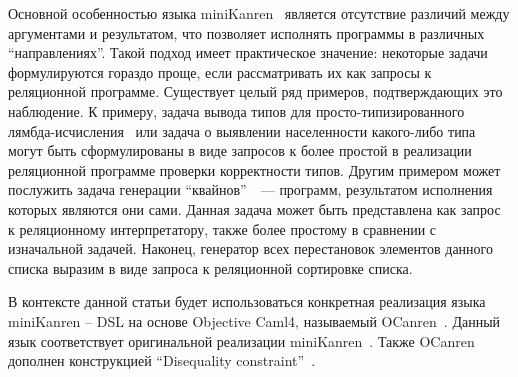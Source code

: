 Основной особенностью языка miniKanren~\cite{lozov-spbu:TheReasonedSchemer,lozov-spbu:miniKanren} является отсутствие различий между аргументами и результатом, что позволяет исполнять программы в различных ``направлениях''. Такой подход имеет практическое значение: некоторые задачи формулируются гораздо проще, если рассматривать их как запросы к реляционной программе. Существует целый ряд примеров, подтверждающих это наблюдение. К примеру, задача вывода типов для просто-типизированного лямбда-исчисления~\cite{Lambda} или задача о выявлении населенности какого-либо типа могут быть сформулированы в виде запросов к более простой в реализации реляционной программе проверки корректности типов. Другим примером может послужить задача генерации ``квайнов''~\cite{lozov-spbu:quines}~--- программ, результатом исполнения которых являются они сами. Данная задача может быть представлена как запрос к реляционному интерпретатору, также более простому в сравнении с изначальной задачей. Наконец, генератор всех перестановок элементов данного списка выразим в виде запроса к реляционной сортировке списка.

В контексте данной статьи будет использоваться конкретная реализация языка miniKanren -- DSL на основе Objective Caml4, называемый OCanren~\cite{lozov-spbu:ocanren-git}. Данный язык соответствует оригинальной реализации miniKanren~\cite{lozov-spbu:implementation}. Также OCanren дополнен конструкцией ``Disequality constraint''~\cite{lozov-spbu:CKanren}.

